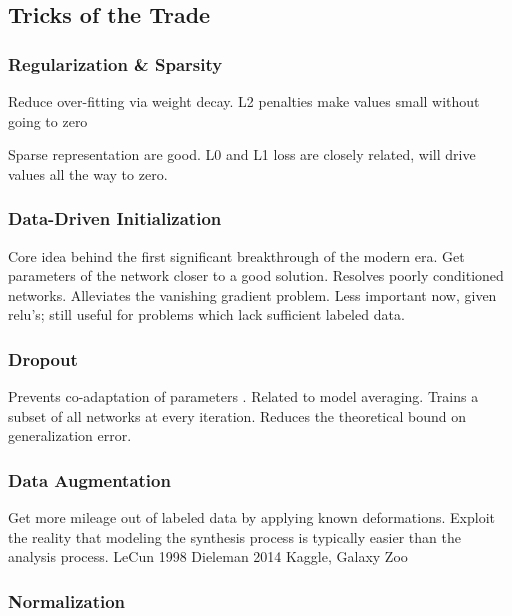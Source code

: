 \subsection{Tricks of the Trade}
\label{subsec:tricks}

\subsubsection{Regularization \& Sparsity}
Reduce over-fitting via weight decay.
L2 penalties make values small without going to zero

Sparse representation are good.
L0 and L1 loss are closely related, will drive values all the way to zero.

\subsubsection{Data-Driven Initialization}

Core idea behind the first significant breakthrough of the modern era.
Get parameters of the network closer to a good solution.
Resolves poorly conditioned networks.
Alleviates the vanishing gradient problem.
Less important now, given relu's; still useful for problems which lack sufficient labeled data.


\subsubsection{Dropout}
Prevents co-adaptation of parameters \cite{Hinton2012}.
Related to model averaging.
Trains a subset of all networks at every iteration.
Reduces the theoretical bound on generalization error.


\subsubsection{Data Augmentation}

Get more mileage out of labeled data by applying known deformations.
Exploit the reality that modeling the synthesis process is typically easier than the analysis process.
LeCun 1998
Dieleman 2014 Kaggle, Galaxy Zoo


\subsubsection{Normalization}


